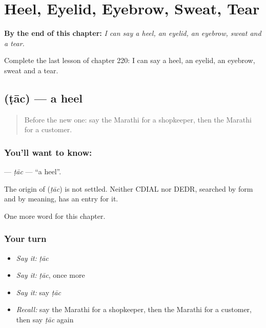 
\chapter{Heel, Eyelid, Eyebrow, Sweat, Tear}
\label{ch:mr-heel-eyelid-eyebrow-sweat-tear}

\begin{chapteropening}
\textbf{By the end of this chapter:} \emph{I can say a heel, an eyelid, an eyebrow, sweat and a tear.}

Complete the last lesson of chapter 220: I can say a heel, an eyelid, an eyebrow, sweat and a tear.
\end{chapteropening}

\section[\texorpdfstring{\mr{टाच} (ṭāc)}{टाच (ṭāc)}]{ (ṭāc) — a heel}

\label{lesson:MR-C220-tac}



\begin{quote}
Before the new one: say the Marathi for a shopkeeper, then the Marathi for a customer.
\end{quote}

\subsection*{You'll want to know: }
\textbf{} — \emph{ṭāc} — \textquotedblleft{}a heel\textquotedblright{}.

\begin{cousinweb}
The origin of \textbf{} (\emph{ṭāc}) is not settled. Neither CDIAL nor DEDR, searched by form and by meaning, has an entry for it.
\end{cousinweb}

\begin{grammarlens}[title={What you've built}]
One more word for this chapter.
\end{grammarlens}

\subsection*{Your turn}
\begin{itemize}
\raggedright
  \item \emph{Say it:} \emph{ṭāc}
  \item \emph{Say it:} \emph{ṭāc}, once more
  \item \emph{Say it:} say \emph{ṭāc}
  \item \emph{Recall:} say the Marathi for a shopkeeper, then the Marathi for a customer, then say \emph{ṭāc} again
\end{itemize}

